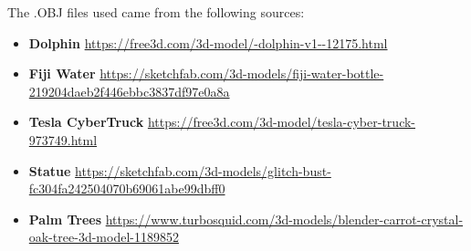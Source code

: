 \documentclass[10pt,letterpaper,oneside]{article}
\numberwithin{equation}{section}		%
\numberwithin{figure}{section}			%
\numberwithin{table}{section}				%
\begin{document}
\noindent
The .OBJ files used came from the following sources:
\begin{itemize}
\item \textbf{Dolphin} \url{https://free3d.com/3d-model/-dolphin-v1--12175.html}
\item \textbf{Fiji Water} \url{https://sketchfab.com/3d-models/fiji-water-bottle-219204daeb2f446ebbc3837df97e0a8a}
\item \textbf{Tesla CyberTruck} \url{https://free3d.com/3d-model/tesla-cyber-truck-973749.html}
\item \textbf{Statue} \url{https://sketchfab.com/3d-models/glitch-bust-fc304fa242504070b69061abe99dbff0}
\item \textbf{Palm Trees} \url{https://www.turbosquid.com/3d-models/blender-carrot-crystal-oak-tree-3d-model-1189852}
\end{itemize}

\end{document}
